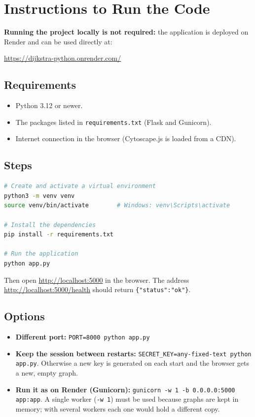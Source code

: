 \documentclass[11pt,letterpaper]{article}
\newcommand{\code}[1]{\texttt{#1}}
\newcommand{\renderlink}{\url{https://dijkstra-python.onrender.com/}}
\begin{document}
\section{Instructions to Run the Code}

\textbf{Running the project locally is not required:} the application is
deployed on Render and can be used directly at:

\begin{center}
  \Large \renderlink
\end{center}

\subsection*{Requirements}
\begin{itemize}[nosep]
  \item Python 3.12 or newer.
  \item The packages listed in \code{requirements.txt} (Flask and Gunicorn).
  \item Internet connection in the browser (Cytoscape.js is loaded from a CDN).
\end{itemize}

\subsection*{Steps}

\begin{lstlisting}[language=bash,numbers=none]
# Create and activate a virtual environment
python3 -m venv venv
source venv/bin/activate        # Windows: venv\Scripts\activate

# Install the dependencies
pip install -r requirements.txt

# Run the application
python app.py
\end{lstlisting}

Then open \url{http://localhost:5000} in the browser. The address
\url{http://localhost:5000/health} should return \code{\{"status":"ok"\}}.

\subsection*{Options}
\begin{itemize}
  \item \textbf{Different port:} \code{PORT=8000 python app.py}
  \item \textbf{Keep the session between restarts:}
        \code{SECRET\_KEY=any-fixed-text python app.py}. Otherwise a new key
        is generated on each start and the browser gets a new, empty graph.
  \item \textbf{Run it as on Render (Gunicorn):}
        \code{gunicorn -w 1 -b 0.0.0.0:5000 app:app}. A single worker
        (\code{-w 1}) must be used because graphs are kept in memory; with
        several workers each one would hold a different copy.
\end{itemize}
\end{document}
